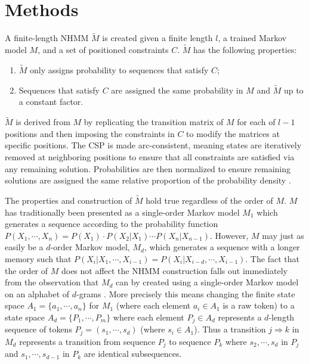 \documentclass[phd,electronic,oneside,twosidetoc,letterpaper,chaptercenter,parttop,lof,lot]{byumsphd}
\begin{document}
\section{Methods}

A finite-length NHMM $\tilde{M}$ is created given a finite length $l$, a trained Markov model $M$, and a set of positioned constraints $C$. $\tilde{M}$ has the following properties:
\begin{enumerate}
\item $\tilde{M}$ only assigns probability to sequences that satisfy $C$;
\item Sequences that satisfy $C$ are assigned the same probability in $M$ and $\tilde{M}$ up to a constant factor.
\end{enumerate}
$\tilde{M}$ is derived from $M$ by replicating the transition matrix of $M$ for each of $l-1$ positions and then imposing the constraints in $C$ to modify the matrices at specific positions. The CSP is made arc-consistent, meaning states are iteratively removed at neighboring positions to ensure that all constraints are satisfied via any remaining solution. Probabilities are then normalized to ensure remaining solutions are assigned the same relative proportion of the probability density \cite{pachet2011finite}.

The properties and construction of $\tilde{M}$  hold true regardless of the order of $M$. $M$ has traditionally been presented as a single-order Markov model $M_1$ which generates a sequence according to the probability function $P(X_1,\cdots,X_n) = P(X_1)\cdot P(X_2|X_1)\cdots P(X_n|X_{n-1})$. However, $M$ may just as easily be a $d$-order Markov model, $M_d$, which generates a sequence with a longer memory such that $P(X_i|X_1,\cdots,X_{i-1}) = P(X_i|X_{i-d},\cdots,X_{i-1})$. The fact that the order of $M$ does not affect the NHMM construction falls out immediately from the observation that $M_d$ can by created using a single-order Markov model on an alphabet of $d$-grams \cite{papadopoulos2015exact}. More precisely this means changing the finite state space ${A_1} = \{a_1, \cdots,a_n\}$ for $M_1$ (where each element $a_i \in A_1$ is a raw token) to a state space $A_d = \{P_1,\cdots,P_m\}$ where each element $P_j \in {A_d}$ represents a $d$-length sequence of tokens $P_j = (s_1, \cdots, s_d)$ (where $s_i \in {A_1}$). Thus a transition $j\Rightarrow k$ in ${M_d}$ represents a transition from sequence $P_j$ to sequence $P_k$ where $s_2, \cdots, s_d$ in $P_j$ and $s_1, \cdots, s_{d-1}$ in $P_k$ are identical subsequences. 
\end{document}
